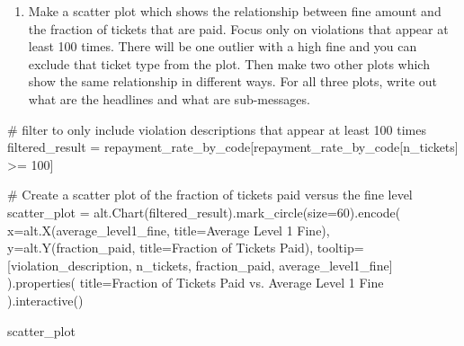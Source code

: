 \documentclass[
  letterpaper,
  DIV=11,
  numbers=noendperiod]{scrartcl}
\newenvironment{Shaded}{\begin{snugshade}}{\end{snugshade}}
\newcommand{\CommentTok}[1]{\textcolor[rgb]{0.37,0.37,0.37}{#1}}
\newcommand{\DecValTok}[1]{\textcolor[rgb]{0.68,0.00,0.00}{#1}}
\newcommand{\NormalTok}[1]{\textcolor[rgb]{0.00,0.23,0.31}{#1}}
\newcommand{\OperatorTok}[1]{\textcolor[rgb]{0.37,0.37,0.37}{#1}}
\newcommand{\StringTok}[1]{\textcolor[rgb]{0.13,0.47,0.30}{#1}}
\providecommand{\tightlist}{%
  \setlength{\itemsep}{0pt}\setlength{\parskip}{0pt}}\usepackage{longtable,booktabs,array}
\begin{document}
\begin{enumerate}
\def\labelenumi{\arabic{enumi}.}
\setcounter{enumi}{1}
\tightlist
\item
  Make a scatter plot which shows the relationship between fine amount
  and the fraction of tickets that are paid. Focus only on violations
  that appear at least 100 times. There will be one outlier with a high
  fine and you can exclude that ticket type from the plot. Then make two
  other plots which show the same relationship in different ways. For
  all three plots, write out what are the headlines and what are
  sub-messages.
\end{enumerate}

\begin{Shaded}
\begin{Highlighting}[]
\CommentTok{\# filter to only include violation descriptions that appear at least 100 times}
\NormalTok{filtered\_result }\OperatorTok{=}\NormalTok{ repayment\_rate\_by\_code[repayment\_rate\_by\_code[}\StringTok{\textquotesingle{}n\_tickets\textquotesingle{}}\NormalTok{] }\OperatorTok{\textgreater{}=} \DecValTok{100}\NormalTok{]}

\CommentTok{\# Create a scatter plot of the fraction of tickets paid versus the fine level}
\NormalTok{scatter\_plot }\OperatorTok{=}\NormalTok{ alt.Chart(filtered\_result).mark\_circle(size}\OperatorTok{=}\DecValTok{60}\NormalTok{).encode(}
\NormalTok{    x}\OperatorTok{=}\NormalTok{alt.X(}\StringTok{\textquotesingle{}average\_level1\_fine\textquotesingle{}}\NormalTok{, title}\OperatorTok{=}\StringTok{\textquotesingle{}Average Level 1 Fine\textquotesingle{}}\NormalTok{),}
\NormalTok{    y}\OperatorTok{=}\NormalTok{alt.Y(}\StringTok{\textquotesingle{}fraction\_paid\textquotesingle{}}\NormalTok{, title}\OperatorTok{=}\StringTok{\textquotesingle{}Fraction of Tickets Paid\textquotesingle{}}\NormalTok{),}
\NormalTok{    tooltip}\OperatorTok{=}\NormalTok{[}\StringTok{\textquotesingle{}violation\_description\textquotesingle{}}\NormalTok{, }\StringTok{\textquotesingle{}n\_tickets\textquotesingle{}}\NormalTok{, }\StringTok{\textquotesingle{}fraction\_paid\textquotesingle{}}\NormalTok{, }\StringTok{\textquotesingle{}average\_level1\_fine\textquotesingle{}}\NormalTok{]}
\NormalTok{).properties(}
\NormalTok{    title}\OperatorTok{=}\StringTok{\textquotesingle{}Fraction of Tickets Paid vs. Average Level 1 Fine\textquotesingle{}}
\NormalTok{).interactive()}

\NormalTok{scatter\_plot}
\end{Highlighting}
\end{Shaded}
\end{document}
